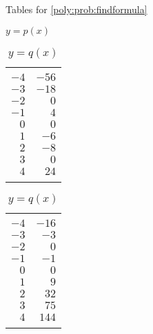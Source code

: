 \begin{exercises}
\begin{problem}
\begin{table}[!htb]
	\centering
	\begin{widepage}
	\caption{Tables for \cref{poly:prob:findformula}}
	\label{poly:tab:findformula}
	\begin{subtable}{.2\textwidth}
		\centering
		\caption{$y=p(x)$}
		\label{poly:tab:findformulap}
		\begin{tabular}{rr}
			\beforeheading
			\heading{$x$} & \heading{$y$} \\
			\afterheading
			$-4$          & $-56$         \\\normalline
			$-3$          & $-18$         \\\normalline
			$-2$          & $0$           \\\normalline
			$-1$          & $4$           \\\normalline
			$0$           & $0$           \\\normalline
			$1$           & $-6$          \\\normalline
			$2$           & $-8$          \\\normalline
			$3$           & $0$           \\\normalline
			$4$           & $24$          \\\lastline
		\end{tabular}
	\end{subtable}
	\hfill
	\begin{subtable}{.2\textwidth}
		\centering
		\caption{$y=q(x)$}
		\label{poly:tab:findformulaq}
		\begin{tabular}{rr}
			\beforeheading
			\heading{$x$} & \heading{$y$} \\ \afterheading
			$-4$          & $-16$         \\\normalline
			$-3$          & $-3$          \\\normalline
			$-2$          & $0$           \\\normalline
			$-1$          & $-1$          \\\normalline
			$0$           & $0$           \\\normalline
			$1$           & $9$           \\\normalline
			$2$           & $32$          \\\normalline
			$3$           & $75$          \\\normalline
			$4$           & $144$         \\\lastline
		\end{tabular}
	\end{subtable}

\end{widepage}
\end{table}
\end{problem}
\end{exercises}
